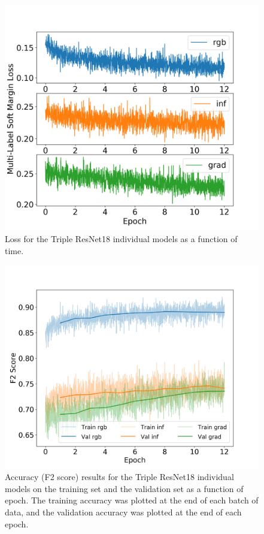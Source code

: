 \documentclass[10pt,twocolumn,letterpaper]{article}
\begin{document}
\begin{figure}
	\includegraphics[width=\columnwidth]{fig/plot_loss_triple_resnet18_tune.png}
    \caption{Loss for the Triple ResNet18 individual models as a function of time.}
    \label{fig:plot_loss_triple_resnet18_tune}
\end{figure}

\begin{figure}
    \includegraphics[width=\columnwidth]{fig/plot_validation_accuracy_triple_resnet18_tune.png}
    \caption{Accuracy (F2 score) results for the Triple ResNet18 individual models on the training set and the validation set as a function of epoch. The training accuracy was plotted at the end of each batch of data, and the validation accuracy was plotted at the end of each epoch.}
    \label{fig:plot_validation_accuracy_triple_resnet18_tune}
\end{figure}
\end{document}
